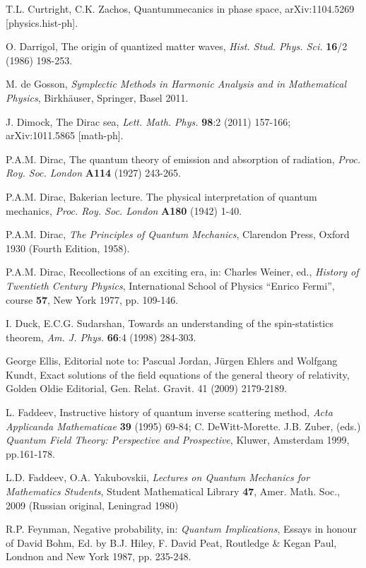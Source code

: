 \documentclass[12pt]{article}
\begin{document}
\begin{thebibliography}{000}
 T.L. Curtright, C.K. Zachos, Quantummecanics in phase space, arXiv:1104.5269 [physics.hist-ph].

 O. Darrigol, The origin of quantized matter waves, {\it Hist.
Stud. Phys. Sci.} {\bf 16}/2 (1986) 198-253.

 M. de Gosson, {\it Symplectic Methods in Harmonic Analysis and in Mathematical 
Physics}, Birkh\"auser, Springer, Basel 2011.
 
 J. Dimock, The Dirac sea, {\it Lett. Math. Phys.} {\bf 98}:2
(2011) 157-166; arXiv:1011.5865 [math-ph].

 P.A.M. Dirac, The quantum theory of emission and absorption
of radiation, {\it Proc. Roy. Soc. London} {\bf A114} (1927) 243-265.

 P.A.M. Dirac, Bakerian lecture. The physical interpretation of 
quantum mechanics, {\it Proc. Roy. Soc. London} {\bf A180} (1942) 1-40.

 P.A.M. Dirac, {\it The Principles of Quantum Mechanics}, 
Clarendon Press, Oxford 1930 (Fourth Edition, 1958).

 P.A.M. Dirac, Recollections of an exciting era, in: Charles 
Weiner, ed., {\it History of Twentieth Century Physics}, International School 
of Physics ``Enrico Fermi'', course {\bf 57}, New York 1977, pp. 109-146.

 I. Duck, E.C.G. Sudarshan, Towards an understanding of the
spin-statistics theorem, {\it Am. J. Phys.} {\bf 66}:4 (1998) 284-303.

 George Ellis, Editorial note to: Pascual Jordan, Jürgen Ehlers and Wolfgang Kundt, Exact
solutions of the field equations of the general theory of relativity, Golden Oldie Editorial, Gen. Relat.
Gravit. 41 (2009) 2179-2189. 

 L. Faddeev, Instructive history of quantum inverse scattering method, {\it Acta Applicanda Mathematicae} {\bf 39} (1995) 69-84; C. DeWitt-Morette. J.B. Zuber, (eds.) {\it Quantum Field Theory: Perspective and Prospective}, Kluwer, Amsterdam 1999, pp.161-178.

 L.D. Faddeev, O.A. Yakubovskii, {\it Lectures on Quantum Mechanics for Mathematics Students}, Student Mathematical Library {\bf 47}, Amer. Math. Soc., 2009 (Russian original, Leningrad 1980)

 R.P. Feynman, Negative probability, in: {\it Quantum Implications}, Essays in honour of David Bohm, 
Ed. by B.J. Hiley, F. David Peat, Routledge \& Kegan Paul, Londnon and New York 1987, pp. 235-248.


\end{thebibliography}
\end{document}
